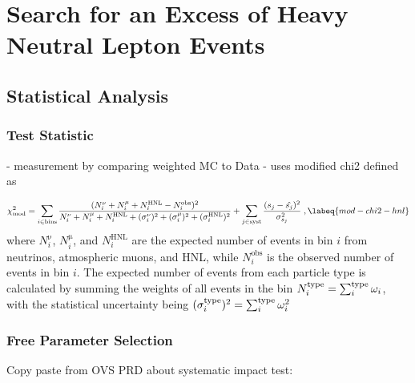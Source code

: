\setchapterpreamble[u]{\margintoc}

\chapter{Search for an Excess of Heavy Neutral Lepton Events}


\section{Statistical Analysis} 

\subsection{Test Statistic}

- measurement by comparing weighted MC to Data
- uses modified chi2 defined as


\begin{equation}
    \chi^2_{\mathrm{mod}} = 
    \sum_{i \in \mathrm{bins}}^{}\frac{(N^{\mathrm{\nu}}_i + N^{\mathrm{\mu}}_i + N^{\mathrm{HNL}}_i - N^{\mathrm{obs}}_i)^2}
    {N^{\mathrm{\nu}}_i + N^{\mathrm{\mu}}_i + N^{\mathrm{HNL}}_i + (\sigma^{\mathrm{\nu}}_i)^2 + (\sigma^{\mathrm{\mu}}_i)^2 + (\sigma^{\mathrm{HNL}}_i)^2}
     + \sum_{j \in \mathrm{syst}}^{}\frac{(s_j - \hat{s_j})^2}{\sigma^2_{s_j}}
    \;,
    \labeq{mod-chi2-hnl}
\end{equation}
where $N^{\mathrm{\nu}}_i$, $N^{\mathrm{\mu}}_i$, and $N^{\mathrm{HNL}}_i$ are the expected number of events in bin $i$ from neutrinos, atmospheric muons, and HNL, while $N^{\mathrm{obs}}_i$ is the observed number of events in bin $i$. The expected number of events from each particle type is calculated by summing the weights of all events in the bin $N^{\mathrm{type}}_i = \sum_i^{\rm type}\omega_i$, with the statistical uncertainty being $(\sigma^{\mathrm{type}}_i)^2 = \sum_i^{\rm type}\omega_i^2$ 


\subsection{Free Parameter Selection} 

Copy paste from OVS PRD about systematic impact test:

